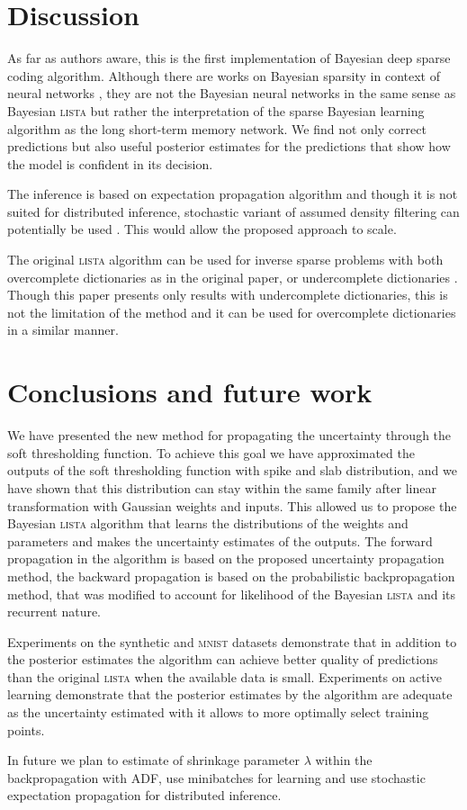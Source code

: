 \documentclass[letterpaper]{article}
\begin{document}
\section{Discussion}
\label{sec:discussion}
As far as authors aware, this is the first implementation of Bayesian deep sparse coding algorithm. Although there are works on Bayesian sparsity in context of neural networks \citep{he2017bayesian}, they are not the Bayesian neural networks in the same sense as Bayesian \textsc{lista} but rather the interpretation of the sparse Bayesian  learning algorithm as the long short-term memory network. We find not only correct predictions but also useful posterior estimates for the predictions that show how the model is confident in its decision. 

The inference is based on expectation propagation algorithm and though it is not suited for distributed inference, stochastic variant of assumed density filtering can potentially be used \citep{li2015stochastic}. This would allow the proposed approach to scale.

The original \textsc{lista} algorithm can be used for inverse sparse problems with both overcomplete dictionaries as in the original paper, or undercomplete dictionaries \citep{borgerding2017amp}. Though this paper presents only results with undercomplete dictionaries, this is not the limitation of the method and it can be used for overcomplete dictionaries in a similar manner.

\section{Conclusions and future work}
\label{sec:conclusions}
We have presented the new method for propagating the uncertainty through the soft thresholding function. To achieve this goal we have approximated the outputs of the soft thresholding function with spike and slab distribution, and we have shown that this distribution can stay within the same family after linear transformation with Gaussian weights and inputs. This allowed us to propose the Bayesian \textsc{lista} algorithm that learns the distributions of the weights and parameters and makes the uncertainty estimates of the outputs. The forward propagation in the algorithm is based on the proposed uncertainty propagation method, the backward propagation is based on the probabilistic backpropagation method, that was modified to account for likelihood of the Bayesian \textsc{lista} and its recurrent nature.

Experiments on the synthetic and \textsc{mnist} datasets demonstrate that in addition to the posterior estimates the algorithm can achieve better quality of predictions than the original \textsc{lista} when the available data is small. Experiments on active learning demonstrate that the posterior estimates by the algorithm are adequate as the uncertainty estimated with it allows to more optimally select training points. 

In future we plan to estimate of shrinkage parameter $\lambda$ within the backpropagation with ADF, use minibatches for learning and use stochastic expectation propagation for distributed inference. 


\end{document}
